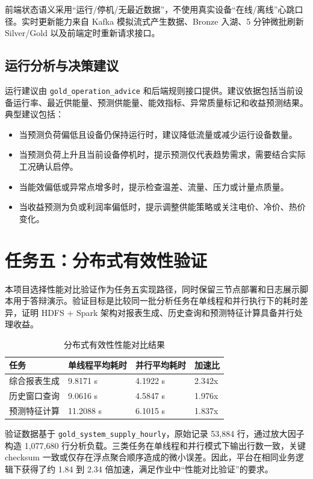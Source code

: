 \documentclass[UTF8,11pt,a4paper]{ctexart}
\newcommand{\code}[1]{\texttt{#1}}
\begin{document}
前端状态语义采用“运行/停机/无最近数据”，不使用真实设备“在线/离线”心跳口径。实时更新能力来自 Kafka 模拟流式产生数据、Bronze 入湖、5 分钟微批刷新 Silver/Gold 以及前端定时重新请求接口。

\subsection{运行分析与决策建议}

运行建议由 \code{gold\_operation\_advice} 和后端规则接口提供。建议依据包括当前设备运行率、最近供能量、预测供能量、能效指标、异常质量标记和收益预测结果。典型建议包括：

\begin{itemize}
  \item 当预测负荷偏低且设备仍保持运行时，建议降低流量或减少运行设备数量。
  \item 当预测负荷上升且当前设备停机时，提示预测仅代表趋势需求，需要结合实际工况确认启停。
  \item 当能效偏低或异常点增多时，提示检查温差、流量、压力或计量点质量。
  \item 当收益预测为负或利润率偏低时，提示调整供能策略或关注电价、冷价、热价变化。
\end{itemize}

\section{任务五：分布式有效性验证}

本项目选择性能对比验证作为任务五实现路径，同时保留三节点部署和日志展示脚本用于答辩演示。验证目标是比较同一批分析任务在单线程和并行执行下的耗时差异，证明 HDFS + Spark 架构对报表生成、历史查询和预测特征计算具备并行处理收益。

\begin{table}[H]
\centering
\small
\begin{tabularx}{\textwidth}{p{3.7cm}p{3.4cm}p{3.4cm}p{2cm}}
\toprule
任务 & 单线程平均耗时 & 并行平均耗时 & 加速比 \\
\midrule
综合报表生成 & 9.8171 s & 4.1922 s & 2.342x \\
历史窗口查询 & 9.0616 s & 4.5847 s & 1.976x \\
预测特征计算 & 11.2088 s & 6.1015 s & 1.837x \\
\bottomrule
\end{tabularx}
\caption{分布式有效性性能对比结果}
\end{table}

验证数据基于 \code{gold\_system\_supply\_hourly}，原始记录 53,884 行，通过放大因子构造 1,077,680 行分析负载。三类任务在单线程和并行模式下输出行数一致，关键 checksum 一致或仅存在浮点聚合顺序造成的微小误差。因此，平台在相同业务逻辑下获得了约 1.84 到 2.34 倍加速，满足作业中“性能对比验证”的要求。
\end{document}
